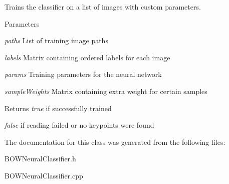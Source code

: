 Trains the classifier on a list of images with custom parameters.


\begin{DoxyParams}{Parameters}
\item[{\em paths}]List of training image paths \item[{\em labels}]Matrix containing ordered labels for each image \item[{\em params}]Training parameters for the neural network \item[{\em sampleWeights}]Matrix containing extra weight for certain samples \end{DoxyParams}
\begin{DoxyReturn}{Returns}
{\itshape true\/} if successfully trained\par
 {\itshape false\/} if reading failed or no keypoints were found 
\end{DoxyReturn}


The documentation for this class was generated from the following files:\begin{DoxyCompactItemize}
\item 
BOWNeuralClassifier.h\item 
BOWNeuralClassifier.cpp\end{DoxyCompactItemize}
